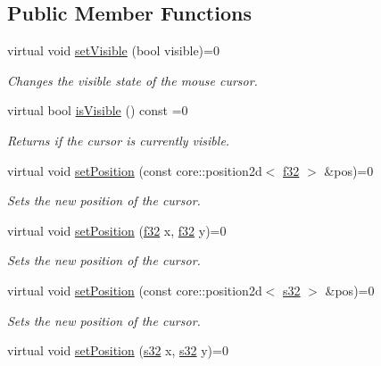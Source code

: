 \subsection*{Public Member Functions}
\begin{DoxyCompactItemize}
\item 
virtual void \hyperlink{classirr_1_1gui_1_1ICursorControl_aceb41d68494e2b2076fbc6949b254c74}{set\+Visible} (bool visible)=0
\begin{DoxyCompactList}\small\item\em Changes the visible state of the mouse cursor. \end{DoxyCompactList}\item 
virtual bool \hyperlink{classirr_1_1gui_1_1ICursorControl_afe03225e5ea27e2b2f97c0e02f04fc2a}{is\+Visible} () const  =0
\begin{DoxyCompactList}\small\item\em Returns if the cursor is currently visible. \end{DoxyCompactList}\item 
virtual void \hyperlink{classirr_1_1gui_1_1ICursorControl_a951b5afe97fa21d98ce5360d96314306}{set\+Position} (const core\+::position2d$<$ \hyperlink{namespaceirr_a0277be98d67dc26ff93b1a6a1d086b07}{f32} $>$ \&pos)=0
\begin{DoxyCompactList}\small\item\em Sets the new position of the cursor. \end{DoxyCompactList}\item 
virtual void \hyperlink{classirr_1_1gui_1_1ICursorControl_adca41054684f73435c9b045520f7c83b}{set\+Position} (\hyperlink{namespaceirr_a0277be98d67dc26ff93b1a6a1d086b07}{f32} x, \hyperlink{namespaceirr_a0277be98d67dc26ff93b1a6a1d086b07}{f32} y)=0
\begin{DoxyCompactList}\small\item\em Sets the new position of the cursor. \end{DoxyCompactList}\item 
virtual void \hyperlink{classirr_1_1gui_1_1ICursorControl_a421c770ffc494f8f6082a16bef0feed2}{set\+Position} (const core\+::position2d$<$ \hyperlink{namespaceirr_ac66849b7a6ed16e30ebede579f9b47c6}{s32} $>$ \&pos)=0
\begin{DoxyCompactList}\small\item\em Sets the new position of the cursor. \end{DoxyCompactList}\item 
virtual void \hyperlink{classirr_1_1gui_1_1ICursorControl_a3b0a59608d1d0810079349acfa01a79b}{set\+Position} (\hyperlink{namespaceirr_ac66849b7a6ed16e30ebede579f9b47c6}{s32} x, \hyperlink{namespaceirr_ac66849b7a6ed16e30ebede579f9b47c6}{s32} y)=0

\end{DoxyCompactItemize}
